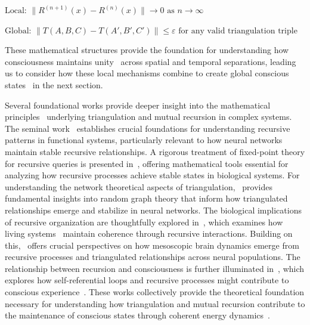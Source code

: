 $\text{Local: } \|R^{(n+1)}(x) - R^{(n)}(x)\| \rightarrow 0 \text{ as } n \rightarrow \infty$

$\text{Global: } \|T(A,B,C) - T(A',B',C')\| \leq \varepsilon \text{ for any valid triangulation triple}$

These mathematical structures provide the foundation for understanding how consciousness maintains unity~ across spatial and temporal separations, leading us to consider how these local mechanisms combine to create global conscious states~ in the next section.

Several foundational works provide deeper insight into the mathematical principles~ underlying triangulation and mutual recursion in complex systems. The seminal work~\cite{Bird1988} establishes crucial foundations for understanding recursive patterns in functional systems, particularly relevant to how neural networks maintain stable recursive relationships. A rigorous treatment of fixed-point theory for recursive queries is presented in~\cite{Alegre2017}, offering mathematical tools essential for analyzing how recursive processes achieve stable states in biological systems. For understanding the network theoretical aspects of triangulation,~\cite{Erdos1959} provides fundamental insights into random graph theory that inform how triangulated relationships emerge and stabilize in neural networks. The biological implications of recursive organization are thoughtfully explored in~\cite{Maturana1987}, which examines how living systems~ maintain coherence through recursive interactions. Building on this,~\cite{Freeman2000} offers crucial perspectives on how mesoscopic brain dynamics emerge from recursive processes and triangulated relationships across neural populations. The relationship between recursion and consciousness is further illuminated in~\cite{Hofstadter2007}, which explores how self-referential loops and recursive processes might contribute to conscious experience~. These works collectively provide the theoretical foundation necessary for understanding how triangulation and mutual recursion contribute to the maintenance of conscious states through coherent energy dynamics~.

